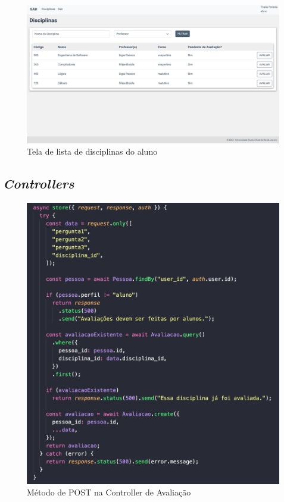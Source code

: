 \begin{figure}[ht]
  \centering
  \includegraphics[width=1\textwidth]{imagens/tela-disciplinas-aluno.png}
  \caption{Tela de lista de disciplinas do aluno}
  \label{fig:fig_tela_disciplinas_aluno}
\end{figure}


\subsection{\textit{Controllers}}


\begin{figure}[h]
  \centering
  \includegraphics[width=1\textwidth]{imagens/codigo-controller-avaliacao.png}
  \caption{Método de POST na Controller de Avaliação}
  \label{fig:fig_cod_controller_avaliacao}
\end{figure}
